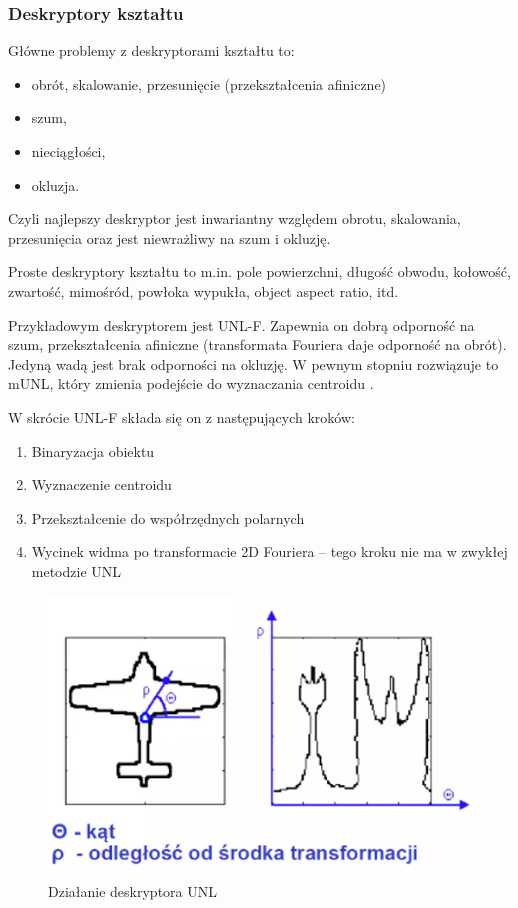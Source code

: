\documentclass[wi]{zut}
\begin{document}
\subsubsection{Deskryptory kształtu}

Główne problemy z deskryptorami kształtu to:

\begin{itemize}
    \item obrót, skalowanie, przesunięcie (przekształcenia afiniczne)
    \item szum,
    \item nieciągłości,
    \item okluzja.
\end{itemize}

Czyli najlepszy deskryptor jest inwariantny względem obrotu, skalowania, przesunięcia oraz jest niewrażliwy na szum i okluzję.

Proste deskryptory kształtu to m.in. pole powierzchni, długość obwodu, kołowość, zwartość, mimośród, powłoka wypukła, object aspect ratio, itd. \cite{Frejlichowski2020_2}

Przykładowym deskryptorem jest UNL-F. Zapewnia on dobrą odporność na szum, przekształcenia afiniczne (transformata Fouriera daje odporność na obrót). Jedyną wadą jest brak odporności na okluzję. W pewnym stopniu rozwiązuje to mUNL, który zmienia podejście do wyznaczania centroidu  \cite{Frejlichowski2020_2}.

W skrócie UNL-F składa się on z następujących kroków:

\begin{enumerate}
    \item Binaryzacja obiektu
    \item Wyznaczenie centroidu
    \item Przekształcenie do współrzędnych polarnych
    \item Wycinek widma po transformacie 2D Fouriera -- tego kroku nie ma w zwykłej metodzie UNL
\end{enumerate}

\begin{figure}[H]
    \centering
    \includegraphics[width=0.5\linewidth]{images/unl.png}
    \caption{Działanie deskryptora UNL}
    \label{fig:unl}
\end{figure}
\end{document}
